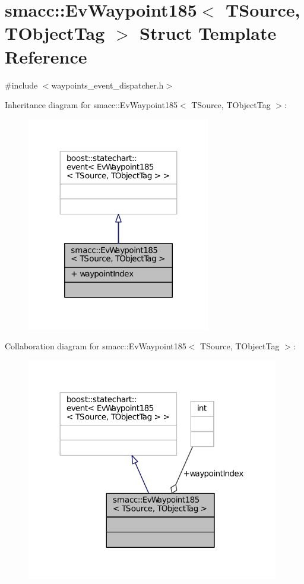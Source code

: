 \hypertarget{structsmacc_1_1EvWaypoint185}{}\section{smacc\+:\+:Ev\+Waypoint185$<$ T\+Source, T\+Object\+Tag $>$ Struct Template Reference}
\label{structsmacc_1_1EvWaypoint185}


{\ttfamily \#include $<$waypoints\+\_\+event\+\_\+dispatcher.\+h$>$}



Inheritance diagram for smacc\+:\+:Ev\+Waypoint185$<$ T\+Source, T\+Object\+Tag $>$\+:
\nopagebreak
\begin{figure}[H]
\begin{center}
\leavevmode
\includegraphics[width=227pt]{structsmacc_1_1EvWaypoint185__inherit__graph}
\end{center}
\end{figure}


Collaboration diagram for smacc\+:\+:Ev\+Waypoint185$<$ T\+Source, T\+Object\+Tag $>$\+:
\nopagebreak
\begin{figure}[H]
\begin{center}
\leavevmode
\includegraphics[width=312pt]{structsmacc_1_1EvWaypoint185__coll__graph}
\end{center}
\end{figure}
